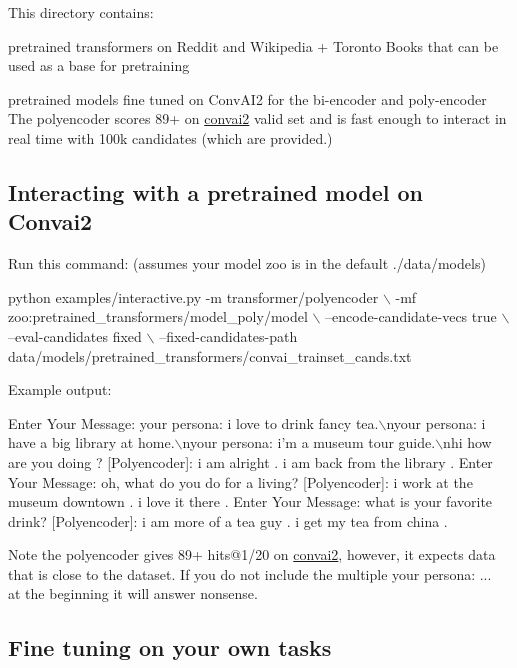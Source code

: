This directory contains\+:
\begin{DoxyItemize}
\item pretrained transformers on Reddit and Wikipedia + Toronto Books that can be used as a base for pretraining
\item pretrained models fine tuned on Conv\+A\+I2 for the bi-\/encoder and poly-\/encoder The polyencoder scores 89+ on \hyperlink{namespaceconvai2}{convai2} valid set and is fast enough to interact in real time with 100k candidates (which are provided.)
\end{DoxyItemize}

\subsection*{Interacting with a pretrained model on Convai2}

Run this command\+: (assumes your model zoo is in the default ./data/models) 
\begin{DoxyCode}
python examples/interactive.py -m transformer/polyencoder \(\backslash\)
    -mf zoo:pretrained\_transformers/model\_poly/model \(\backslash\)
    --encode-candidate-vecs true \(\backslash\)
    --eval-candidates fixed  \(\backslash\)
    --fixed-candidates-path data/models/pretrained\_transformers/convai\_trainset\_cands.txt
\end{DoxyCode}


Example output\+: 
\begin{DoxyCode}
Enter Your Message: your persona: i love to drink fancy tea.\(\backslash\)nyour persona: i have a big library at
       home.\(\backslash\)nyour persona: i'm a museum tour guide.\(\backslash\)nhi how are you doing ?
[Polyencoder]: i am alright . i am back from the library .
Enter Your Message: oh, what do you do for a living?
[Polyencoder]: i work at the museum downtown . i love it there .
Enter Your Message: what is your favorite drink?
[Polyencoder]: i am more of a tea guy . i get my tea from china .
\end{DoxyCode}


Note the polyencoder gives 89+ hits@1/20 on \hyperlink{namespaceconvai2}{convai2}, however, it expects data that is close to the dataset. If you do not include the multiple \textquotesingle{}your persona\+: ...~\newline
\textquotesingle{} at the beginning it will answer nonsense.

\subsection*{Fine tuning on your own tasks}

